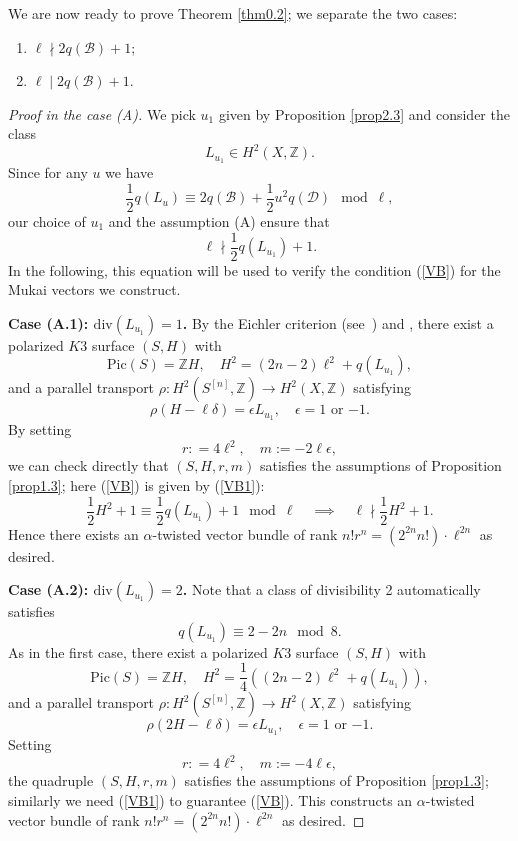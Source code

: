 \documentclass[11pt]{amsart}
\theoremstyle{plain}
\theoremstyle{definition}
\theoremstyle{remark}
\newcommand{\BZ}{{\mathbb{Z}}}
\newcommand{\CB}{{\mathcal B}}
\newcommand{\CD}{{\mathcal D}}
\begin{document}
We are now ready to prove Theorem \ref{thm0.2}; we separate the two cases:

\begin{enumerate}
    \item[(A)] $\ell \nmid 2q(\CB) +1$;
    \item[(B)] $\ell \mid 2q(\CB)+1$.
\end{enumerate}

\begin{proof}[Proof in the case (A)]
We pick $u_1$ given by Proposition \ref{prop2.3} and consider the class
\[
L_{u_1} \in H^2(X, \BZ).
\]
Since for any $u$ we have
\[
\frac{1}{2}q(L_{u}) \equiv 2q(\CB) + \frac{1}{2}u^2q(\CD) \mod \ell,
\]
our choice of $u_1$ and the assumption (A) ensure that
\begin{equation}\label{VB1}
\ell \nmid \frac{1}{2}q(L_{u_1}) +1.
\end{equation}
In the following, this equation will be used to verify the condition (\ref{VB}) for the Mukai vectors we construct.
\medskip

{\bf \noindent Case (A.1): $\mathrm{div}(L_{u_1})=1$.} By the Eichler criterion (see~\cite[Lemma 3.5 and Example 3.8]{GHS}) and \cite[Theorem 9.8]{Torelli}, there exist a polarized $K3$ surface $(S,H)$ with
\[
\mathrm{Pic}(S) = \BZ H, \quad H^2= (2n-2)\ell^2+ q(L_{u_1}),
\]
and a parallel transport $\rho: H^2(S^{[n]}, \BZ) \to H^2(X,\BZ)$ satisfying 
\[
\rho(H-\ell \delta) = \epsilon L_{u_1} , \quad \epsilon  = 1 \textrm{ or } {-1}.
\]
By setting 
\[
r: = 4\ell^2, \quad  m := -2\ell \epsilon,
\]
we can check directly that $(S,H, r, m)$ satisfies the assumptions of Proposition \ref{prop1.3}; here (\ref{VB}) is given by (\ref{VB1}):
\[
\frac{1}{2}H^2+1 \equiv \frac{1}{2}q(L_{u_1}) +1 \mod \ell  \quad  \implies \quad \ell \nmid \frac{1}{2}H^2+1.
\]
Hence there exists an $\alpha$-twisted vector bundle of rank $n!r^n = \left(2^{2n}n!\right)\cdot \ell^{2n}$ as desired.
\medskip

{\bf \noindent Case (A.2): $\mathrm{div}(L_{u_1})=2$.} Note that a class of divisibility 2 automatically satisfies
\[
q(L_{u_1}) \equiv 2-2n \mod 8.
\]
As in the first case, there exist a polarized $K3$ surface $(S,H)$ with
\[
\mathrm{Pic}(S) = \BZ H, \quad H^2= \frac{1}{4}\left((2n-2)\ell^2+ q(L_{u_1})\right),
\]
and a parallel transport $\rho: H^2(S^{[n]}, \BZ) \to H^2(X,\BZ)$ satisfying 
\[
\rho(2H-\ell \delta) = \epsilon L_{u_1} , \quad \epsilon  = 1 \textrm{ or } {-1}.
\]
Setting 
\[
r: = 4\ell^2, \quad  m := -4\ell \epsilon,
\]
the quadruple $(S,H, r, m)$ satisfies the assumptions of Proposition \ref{prop1.3}; similarly we need (\ref{VB1}) to guarantee (\ref{VB}). This constructs an $\alpha$-twisted vector bundle of rank $n!r^n = \left(2^{2n}n!\right)\cdot \ell^{2n}$ as desired.
\end{proof}
\end{document}

